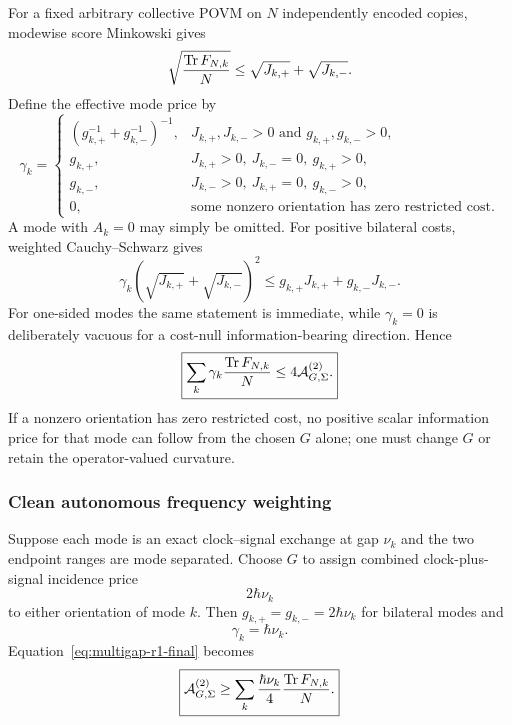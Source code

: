 For a fixed arbitrary collective POVM on $N$ independently encoded copies, modewise score Minkowski gives
\begin{equation}
\sqrt{\frac{\operatorname{Tr} F_{N,k}}{N}}
\le\sqrt{J_{k,+}}+\sqrt{J_{k,-}}.
\end{equation}
Define the effective mode price by
\begin{equation}
\gamma_k=
\begin{cases}
(g_{k,+}^{-1}+g_{k,-}^{-1})^{-1},
&J_{k,+},J_{k,-}>0\text{ and }g_{k,+},g_{k,-}>0,\\[1mm]
g_{k,+},
&J_{k,+}>0,\ J_{k,-}=0,\ g_{k,+}>0,\\[1mm]
g_{k,-},
&J_{k,-}>0,\ J_{k,+}=0,\ g_{k,-}>0,\\[1mm]
0,
&\text{some nonzero orientation has zero restricted cost.}
\end{cases}
\label{eq:gamma-r1}
\end{equation}
A mode with $A_k=0$ may simply be omitted. For positive bilateral costs, weighted Cauchy--Schwarz gives
\begin{equation}
\gamma_k(\sqrt{J_{k,+}}+\sqrt{J_{k,-}})^2
\le g_{k,+}J_{k,+}+g_{k,-}J_{k,-}.
\end{equation}
For one-sided modes the same statement is immediate, while $\gamma_k=0$ is deliberately vacuous for a cost-null information-bearing direction. Hence
\begin{equation}
\boxed{
\sum_k\gamma_k\frac{\operatorname{Tr} F_{N,k}}{N}
\le4\mathcal A_{G,\Sigma}^{(2)}.
}
\label{eq:multigap-r1-final}
\end{equation}
If a nonzero orientation has zero restricted cost, no positive scalar information price for that mode can follow from the chosen $G$ alone; one must change $G$ or retain the operator-valued curvature.

\subsubsection{Clean autonomous frequency weighting}

Suppose each mode is an exact clock--signal exchange at gap $\nu_k$ and the two endpoint ranges are mode separated. Choose $G$ to assign combined clock-plus-signal incidence price
\begin{equation}
2\hbar\nu_k
\end{equation}
to either orientation of mode $k$. Then $g_{k,+}=g_{k,-}=2\hbar\nu_k$ for bilateral modes and
\begin{equation}
\gamma_k=\hbar\nu_k.
\end{equation}
Equation~\eqref{eq:multigap-r1-final} becomes
\begin{equation}
\boxed{
\mathcal A_{G,\Sigma}^{(2)}
\ge
\sum_k\frac{\hbar\nu_k}{4}\frac{\operatorname{Tr} F_{N,k}}{N}.
}
\label{eq:clean-multigap-r1}
\end{equation}

